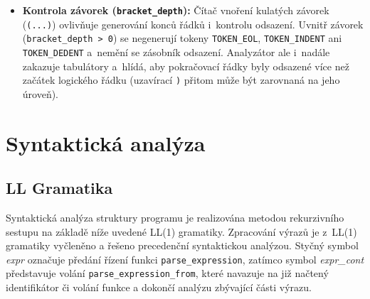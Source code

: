 \documentclass[]{ifjclass}
\begin{document}
\begin{itemize}
    \item \textbf{Kontrola závorek (\texttt{bracket\_depth}):} Čítač vnoření kulatých závorek (\texttt{(...)}) ovlivňuje generování konců řádků i~kontrolu odsazení. Uvnitř závorek (\texttt{bracket\_depth > 0}) se negenerují tokeny \texttt{TOKEN\_EOL}, \texttt{TOKEN\_INDENT} ani \texttt{TOKEN\_DEDENT} a~nemění se zásobník odsazení. Analyzátor ale i~nadále zakazuje tabulátory a~hlídá, aby pokračovací řádky byly odsazené více než začátek logického řádku (uzavírací \texttt{)} přitom může být zarovnaná na jeho úroveň).
\end{itemize}

    \newpage
    \section{Syntaktická analýza}
        \subsection{LL Gramatika}
Syntaktická analýza struktury programu je realizována metodou rekurzivního sestupu na základě níže uvedené LL(1) gramatiky. 
Zpracování výrazů je z~LL(1) gramatiky vyčleněno a řešeno precedenční syntaktickou analýzou. Styčný symbol \textit{expr} označuje předání řízení funkci \texttt{parse\_expression}, zatímco symbol \textit{expr\_cont} představuje volání \texttt{parse\_expression\_from}, které navazuje na již načtený identifikátor či volání funkce a dokončí analýzu zbývající části výrazu.
\end{document}
